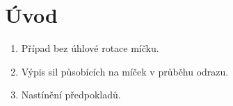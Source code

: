 \chapter*{Úvod}

\begin{enumerate}
 \item Případ bez úhlové rotace míčku.
 \item Výpis sil působících na míček v průběhu odrazu.
 \item Nastínění předpokladů.
\end{enumerate}
